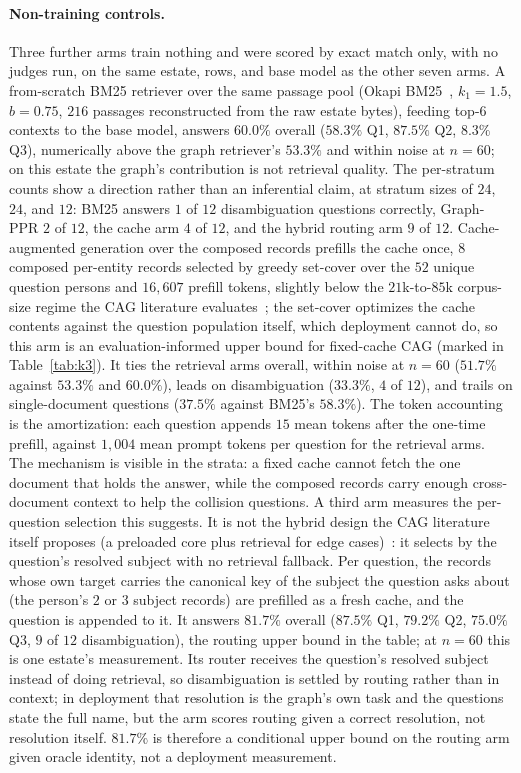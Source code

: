 \documentclass{article}
\begin{document}
\paragraph{Non-training controls.}
Three further arms train nothing and were scored by exact match only, with no judges run, on the same estate, rows, and base model as the other seven arms. A from-scratch BM25 retriever over the same passage pool (Okapi BM25~\cite{robertson2009bm25}, $k_1{=}1.5$, $b{=}0.75$, $216$ passages reconstructed from the raw estate bytes), feeding top-6 contexts to the base model, answers $60.0\%$ overall ($58.3\%$ Q1, $87.5\%$ Q2, $8.3\%$ Q3), numerically above the graph retriever's $53.3\%$ and within noise at $n{=}60$; on this estate the graph's contribution is not retrieval quality. The per-stratum counts show a direction rather than an inferential claim, at stratum sizes of $24$, $24$, and $12$: BM25 answers $1$ of $12$ disambiguation questions correctly, Graph-PPR $2$ of $12$, the cache arm $4$ of $12$, and the hybrid routing arm $9$ of $12$. Cache-augmented generation over the composed records prefills the cache once, $8$ composed per-entity records selected by greedy set-cover over the $52$ unique question persons and $16{,}607$ prefill tokens, slightly below the $21$k-to-$85$k corpus-size regime the CAG literature evaluates~\cite{chan2024cag}; the set-cover optimizes the cache contents against the question population itself, which deployment cannot do, so this arm is an evaluation-informed upper bound for fixed-cache CAG (marked in Table~\ref{tab:k3}). It ties the retrieval arms overall, within noise at $n{=}60$ ($51.7\%$ against $53.3\%$ and $60.0\%$), leads on disambiguation ($33.3\%$, $4$ of $12$), and trails on single-document questions ($37.5\%$ against BM25's $58.3\%$). The token accounting is the amortization: each question appends $15$ mean tokens after the one-time prefill, against $1{,}004$ mean prompt tokens per question for the retrieval arms. The mechanism is visible in the strata: a fixed cache cannot fetch the one document that holds the answer, while the composed records carry enough cross-document context to help the collision questions. A third arm measures the per-question selection this suggests. It is not the hybrid design the CAG literature itself proposes (a preloaded core plus retrieval for edge cases)~\cite{chan2024cag}: it selects by the question's resolved subject with no retrieval fallback. Per question, the records whose own target carries the canonical key of the subject the question asks about (the person's $2$ or $3$ subject records) are prefilled as a fresh cache, and the question is appended to it. It answers $81.7\%$ overall ($87.5\%$ Q1, $79.2\%$ Q2, $75.0\%$ Q3, $9$ of $12$ disambiguation), the routing upper bound in the table; at $n{=}60$ this is one estate's measurement. Its router receives the question's resolved subject instead of doing retrieval, so disambiguation is settled by routing rather than in context; in deployment that resolution is the graph's own task and the questions state the full name, but the arm scores routing given a correct resolution, not resolution itself. $81.7\%$ is therefore a conditional upper bound on the routing arm given oracle identity, not a deployment measurement. 
\end{document}
